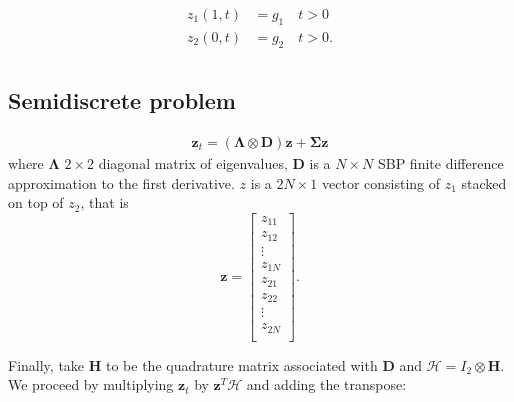 \documentclass[12pt]{article}
\begin{document}
\begin{flushleft}
\begin{align*}
z_1(1, t) &= g_1 \quad t>0 \\
z_2(0,t) &= g_2  \quad t>0.\\
\end{align*}

\subsection*{Semidiscrete problem}

\begin{align*}
\mathbf{z}_t = (\boldsymbol{\Lambda} \otimes \boldsymbol{D}) \mathbf{z} + \boldsymbol{\Sigma} \mathbf{z}
\end{align*}
where $\boldsymbol{\Lambda}$ $2 \times 2$ diagonal matrix of eigenvalues, $\boldsymbol{D}$ is a $N\times N$ SBP finite difference approximation to the first derivative. $z$ is a $2N\times 1$ vector consisting of $z_1$ stacked on top of $z_2$, that is
$$\mathbf{z} = \begin{bmatrix}
z_{11}\\
z_{12}\\
\vdots \\
z_{1N}\\
z_{21}\\
z_{22}\\
\vdots \\
z_{2N}\\
\end{bmatrix}.$$

Finally, take $\boldsymbol{H}$ to be the quadrature matrix associated with $\mathbf{D}$ and $\mathcal{H} = I_2 \otimes \boldsymbol{H}$. We proceed by multiplying $\mathbf{z}_t$ by $\mathbf{z}^{T}\mathcal{H}$ and adding the transpose:


\end{flushleft}
\end{document}
